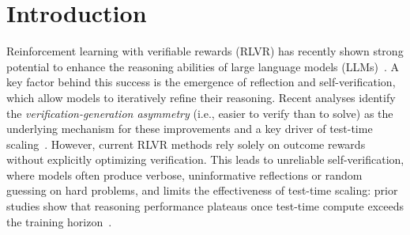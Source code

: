 \documentclass{article} %
\begin{document}
\section{Introduction}
\label{sec:Introduction}
Reinforcement learning with verifiable rewards (RLVR) has recently shown strong potential to enhance the reasoning abilities of large language models (LLMs)~\citep{guo2025deepseek,openai_learning_to_reason}. A key factor behind this success is the emergence of reflection and self-verification, which allow models to iteratively refine their reasoning. Recent analyses identify the \emph{verification-generation asymmetry} (i.e., easier to verify than to solve) as the underlying mechanism for these improvements and a key driver of test-time scaling~\citep{wei2025verifierlaw,setlur2025e3learningexploreenables}. However, current RLVR methods rely solely on outcome rewards without explicitly optimizing verification. This leads to unreliable self-verification, where models often produce verbose, uninformative reflections or random guessing on hard problems, and limits the effectiveness of test-time scaling: prior studies show that reasoning performance plateaus once test-time compute exceeds the training horizon~\citep{setlur2025e3learningexploreenables}.

\end{document}
